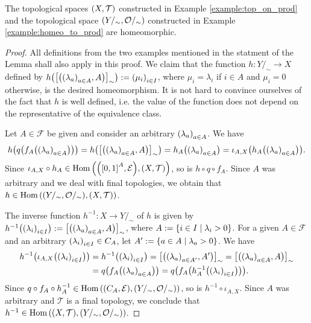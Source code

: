 \begin{lemma}\label{lemma:homeo_of_constr}
	The topological spaces $\tspace$ constructed in Example \ref{example:top_on_prod} and the topological space $\pbraces{Y/_\sim, \mathcal{O}/_\sim}$ constructed in Example \ref{example:homeo_to_prod} are homeomorphic. 
\end{lemma}
\begin{proof}
	All definitions from the two examples mentioned in the statment of the Lemma shall also apply in this proof. We claim that the function $h: Y/_\sim \to X$ defined by $h\pbraces{\bbraces{\pbraces{\pbraces{\lambda_a}_{a \in A}, A}}_\sim} := \pbraces{\mu_i}_{i \in I}$, where $\mu_i = \lambda_i$ if $i \in A$ and $\mu_i = 0$ otherwise, is the desired homeomorphism. It is not hard to convince ourselves of the fact that $h$ is well defined, i.e. the value of the function does not depend on the representative of the equivalence class. 
	
	Let $A \in \mathcal{F}$ be given and consider an arbitrary $\pbraces{\lambda_a}_{a \in A}$. We have
	\begin{align*}
		h\pbraces{q\pbraces{f_A\pbraces{\pbraces{\lambda_a}_{a \in A}}}} = h\pbraces{\bbraces{\pbraces{\pbraces{\lambda_a}_{a \in A}, A}}_\sim} = h_A\pbraces{\pbraces{\lambda_a}_{a \in A}} = \iota_{A,X}\pbraces{h_A\pbraces{\pbraces{\lambda_a}_{a \in A}}}.
	\end{align*}
	Since $\iota_{A,X} \circ h_A \in \Hom\pbraces{\eucl[\bbraces{0,1}^A], \tspace}$, so is $h \circ q \circ f_A$. Since $A$ was arbitrary and we deal with final topologies, we obtain that $h \in \Hom\pbraces{\pbraces{Y/_\sim, \mathcal{O}/_\sim}, \tspace}$. 

	
	The inverse function $h^{-1}: X \to Y/_\sim$ of $h$ is given by $h^{-1}\pbraces{\pbraces{\lambda_i}_{i \in I}} := \bbraces{\pbraces{\pbraces{\lambda_a}_{a \in A}, A}}_\sim$, where $A := \Bbraces{i \in I \mid \lambda_i > 0}$. For a given $A \in \mathcal{F}$ and an arbitrary $\pbraces{\lambda_i}_{i \in I} \in C_A$, let $A^\prime := \Bbraces{a \in A \mid \lambda_a > 0}$. We have
	\begin{align*}
		h^{-1}\pbraces{\iota_{A,X}\pbraces{\pbraces{\lambda_i}_{i \in I}}} &= h^{-1}\pbraces{\pbraces{\lambda_i}_{i \in I}} = \bbraces{\pbraces{\pbraces{\lambda_a}_{a \in A^\prime}, A^\prime}}_\sim = \bbraces{\pbraces{\pbraces{\lambda_a}_{a \in A}, A}}_\sim \\
		&= q\pbraces{f_A\pbraces{\pbraces{\lambda_a}_{a \in A}}} =  q\pbraces{f_A\pbraces{h_A^{-1}\pbraces{\pbraces{\lambda_i}_{i \in I}}}}.
	\end{align*}
	Since $q \circ f_A \circ h_A^{-1} \in \Hom\pbraces{\eucl[C_A], \pbraces{Y/_\sim, \mathcal{O}/_\sim}}$, so is $h^{-1} \circ \iota_{A,X}$. Since $A$ was arbitrary and $\mathcal{T}$ is a final topology, we conclude that $h^{-1} \in \Hom\pbraces{\tspace, \pbraces{Y/_\sim, \mathcal{O}/_\sim}}$. 
\end{proof}

